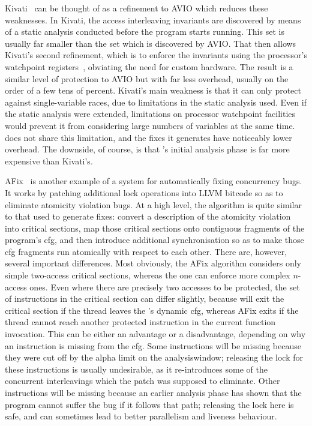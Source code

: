 Kivati~\cite{Chew2010} can be thought of as a refinement to AVIO which
reduces these weaknesses.  In Kivati, the access interleaving
invariants are discovered by means of a static analysis conducted
before the program starts running.  This set is usually far smaller
than the set which is discovered by AVIO.  That then allows Kivati's
second refinement, which is to enforce the invariants using the
processor's watchpoint registers~\cite[Chapter 16.2: Debug
  Registers]{Intel2009}, obviating the need for custom hardware.  The
result is a similar level of protection to AVIO but with far less
overhead, usually on the order of a few tens of percent.  Kivati's
main weakness is that it can only protect against single-variable
races, due to limitations in the static analysis used.  Even if the
static analysis were extended, limitations on processor watchpoint
facilities would prevent it from considering large numbers of
variables at the same time.  {\Technique} does not share this
limitation, and the fixes it generates have noticeably lower overhead.
The downside, of course, is that {\technique}'s initial analysis phase
is far more expensive than Kivati's.

AFix~\cite{Jin2011} is another example of a system for automatically
fixing concurrency bugs.  It works by patching additional lock
operations into LLVM bitcode so as to eliminate atomicity violation
bugs.  At a high level, the algorithm is quite similar to that used to
generate {\technique} fixes: convert a description of the atomicity
violation into critical sections, map those critical sections onto
contiguous fragments of the program's \gls{cfg}, and then introduce
additional synchronisation so as to make those \gls{cfg} fragments run
atomically with respect to each other.  There are, however, several
important differences.  Most obviously, the AFix algorithm considers
only simple two-access critical sections, whereas the {\technique} one
can enforce more complex $n$-access ones.  Even where there are
precisely two accesses to be protected, the set of instructions in the
critical section can differ slightly, because {\technique} will exit
the critical section if the thread leaves the {\StateMachine}'s
dynamic \gls{cfg}, whereas AFix exits if the thread cannot reach
another protected instruction in the current function invocation.
This can be either an advantage or a disadvantage, depending on why an
instruction is missing from the {\StateMachine} \gls{cfg}.  Some
instructions will be missing because they were cut off by the
\gls{alpha} limit on the \gls{analysiswindow}; releasing the lock for
these instructions is usually undesirable, as it re-introduces some of
the concurrent interleavings which the patch was supposed to
eliminate.  Other instructions will be missing because an earlier
analysis phase has shown that the program cannot suffer the bug if it
follows that path; releasing the lock here is safe, and can sometimes
lead to better parallelism and liveness behaviour.

